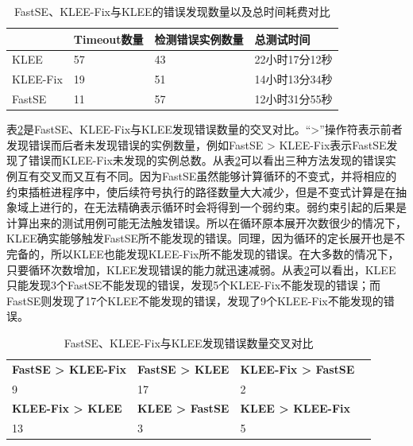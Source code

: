 \begin{table}[ht]
\begin{center}
\caption{FastSE、KLEE-Fix与KLEE的错误发现数量以及总时间耗费对比}
\label{FastSE_KLEE-Fix与KLEE的发现错误数量以及总时间耗费对比}
\begin{small}
\begin{tabular}{|l|l|l|l|}
\hline
{\bf } & {\bf Timeout数量} & {\bf 检测错误实例数量} & {\bf 总测试时间} \\
\hline
KLEE & 57 & 43 & 22小时17分12秒 \\
KLEE-Fix & 19 & 51 & 14小时13分34秒\\
FastSE & 11 & 57 & 12小时31分55秒\\
\hline
\end{tabular}
\end{small}
\end{center}
\end{table}

表\ref{FastSE_KLEE-Fix与KLEE发现错误数量交叉对比}是FastSE、KLEE-Fix与KLEE发现错误数量的交叉对比。“>”操作符表示前者发现错误而后者未发现错误的实例数量，例如FastSE > KLEE-Fix表示FastSE发现了错误而KLEE-Fix未发现的实例总数。从表\ref{FastSE_KLEE-Fix与KLEE发现错误数量交叉对比}可以看出三种方法发现的错误实例互有交叉而又互有不同。因为FastSE虽然能够计算循环的不变式，并将相应的约束插桩进程序中，使后续符号执行的路径数量大大减少，但是不变式计算是在抽象域上进行的，在无法精确表示循环时会将得到一个弱约束。弱约束引起的后果是计算出来的测试用例可能无法触发错误。所以在循环原本展开次数很少的情况下，KLEE确实能够触发FastSE所不能发现的错误。同理，因为循环的定长展开也是不完备的，所以KLEE也能发现KLEE-Fix所不能发现的错误。在大多数的情况下，只要循环次数增加，KLEE发现错误的能力就迅速减弱。从表\ref{FastSE_KLEE-Fix与KLEE发现错误数量交叉对比}可以看出，KLEE只能发现3个FastSE不能发现的错误，发现5个KLEE-Fix不能发现的错误；而FastSE则发现了17个KLEE不能发现的错误，发现了9个KLEE-Fix不能发现的错误。

\begin{table}[ht]
\begin{center}
\caption{FastSE、KLEE-Fix与KLEE发现错误数量交叉对比}
\label{FastSE_KLEE-Fix与KLEE发现错误数量交叉对比}
\begin{small}
\begin{tabular}{|l|l|l|l|}
\hline
{\bf FastSE > KLEE-Fix} & {\bf FastSE > KLEE} & {\bf KLEE-Fix > FastSE} \\
9 & 17 & 2 \\ \hline
{\bf KLEE-Fix > KLEE} & {\bf KLEE > FastSE} & {\bf KLEE > KLEE-Fix} \\
13 & 3 & 5\\
\hline
\end{tabular}
\end{small}
\end{center}
\end{table}


